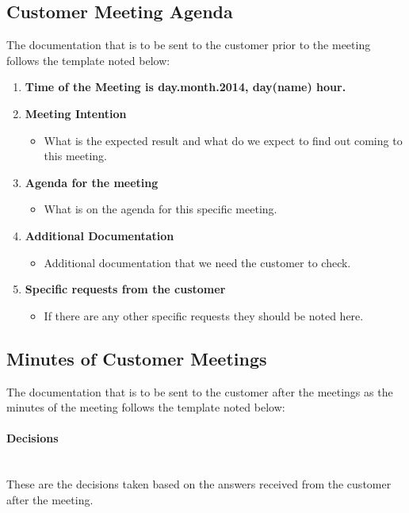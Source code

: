 \documentclass[../document]{subfiles}
\begin{document}
\newpage
\subsection{Customer Meeting Agenda}
\label{customer_meeting_agenda}
The documentation that is to be sent to the customer prior to the meeting follows the template noted below:

\begin{enumerate}
	\item
	\textbf{Time of the Meeting is day.month.2014, day(name) hour.}
	\item
	\textbf{Meeting Intention}
	\begin{itemize}
		\item
		What is the expected result and what do we expect to find out coming to this meeting.
	\end{itemize}
	\item
	\textbf{Agenda for the meeting}
	\begin{itemize}
		\item
		What is on the agenda for this specific meeting.
	\end{itemize}
	\item
	\textbf{Additional Documentation}
	\begin{itemize}
		\item
		Additional documentation that we need the customer to check.
	\end{itemize}
	\item
	\textbf{Specific requests from the customer}
	\begin{itemize}
		\item
		If there are any other specific requests they should be noted here.
	\end{itemize}
\end{enumerate}

\newpage
\subsection{Minutes of Customer Meetings}
\label{minutes_of_customer_meetings}
The documentation that is to be sent to the customer after the meetings as the minutes of the meeting follows the template noted below:

\paragraph{Decisions} \ \\
These are the decisions taken based on the answers received from the customer after the meeting.
\end{document}
